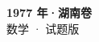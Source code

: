 \documentclass[zihao=-4, a4paper]{ctexart}
\begin{document}
\begin{center}
  {\Large\bfseries 1977 年·湖南卷}\\[4pt]
  {\large 数学 · 试题版}
\end{center}
\medskip
{}

\end{document}
